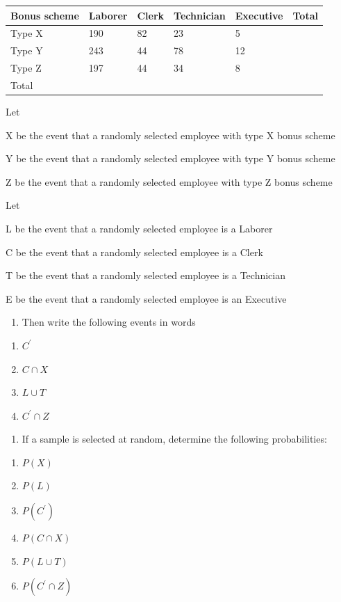 \documentclass[]{book}
\providecommand{\tightlist}{%
  \setlength{\itemsep}{0pt}\setlength{\parskip}{0pt}}
\begin{document}
\begin{longtable}[]{@{}llllll@{}}
\toprule
Bonus scheme & Laborer & Clerk & Technician & Executive & Total\tabularnewline
\midrule
\endhead
Type X & 190 & 82 & 23 & 5 &\tabularnewline
Type Y & 243 & 44 & 78 & 12 &\tabularnewline
Type Z & 197 & 44 & 34 & 8 &\tabularnewline
Total & & & & &\tabularnewline
\bottomrule
\end{longtable}

Let

X be the event that a randomly selected employee with type X bonus scheme

Y be the event that a randomly selected employee with type Y bonus scheme

Z be the event that a randomly selected employee with type Z bonus scheme

Let

L be the event that a randomly selected employee is a Laborer

C be the event that a randomly selected employee is a Clerk

T be the event that a randomly selected employee is a Technician

E be the event that a randomly selected employee is an Executive

\begin{enumerate}
\def\labelenumi{\Roman{enumi}.}
\tightlist
\item
  Then write the following events in words
\end{enumerate}

\begin{enumerate}
\def\labelenumi{(\alph{enumi})}
\tightlist
\item
  \(C^\prime\)
\item
  \(C \cap X\)
\item
  \(L \cup T\)
\item
  \(C^\prime \cap Z\)
\end{enumerate}

\begin{enumerate}
\def\labelenumi{\Roman{enumi}.}
\setcounter{enumi}{1}
\tightlist
\item
  If a sample is selected at random, determine the following probabilities:
\end{enumerate}

\begin{enumerate}
\def\labelenumi{(\alph{enumi})}
\tightlist
\item
  \(P(X)\)
\item
  \(P(L)\)
\item
  \(P(C^\prime)\)
\item
  \(P(C \cap X)\)
\item
  \(P( L \cup T)\)
\item
  \(P(C^\prime \cap Z)\)
\end{enumerate}
\end{document}
